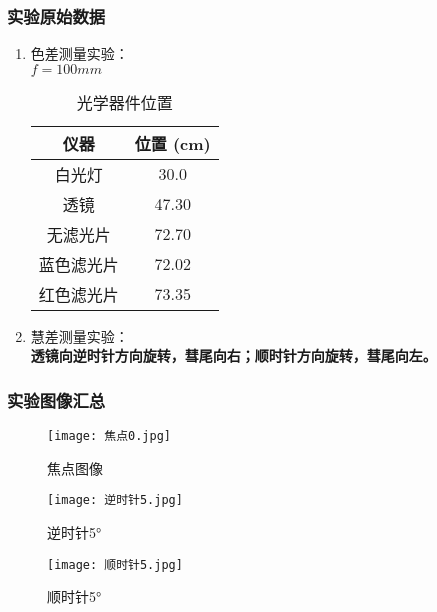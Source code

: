 \documentclass[dvipsnames, svgnames,a4paper,11pt]{article}
\begin{document}
\subsubsection{实验原始数据}
\begin{enumerate}
	\item 色差测量实验：\\$f=100mm$\\
	\begin{table}[htbp]
		\centering
		\begin{tabular}{|c|c|}
			\hline
			仪器& 位置 (cm) \\
			\hline
			白光灯 & 30.0 \\
			透镜 & 47.30 \\
			无滤光片 & 72.70 \\
			蓝色滤光片 & 72.02 \\
			红色滤光片 & 73.35 \\
			\hline
		\end{tabular}
		\caption{光学器件位置}
		\label{tab:positions}
	\end{table}
	      
	\item 慧差测量实验：\\\textbf{透镜向逆时针方向旋转，彗尾向右；顺时针方向旋转，彗尾向左。}

	
	    
	      
\end{enumerate}

\subsubsection{实验图像汇总}
\begin{figure}[H]
	\begin{minipage}[b]{0.3\linewidth}
	  \centering
	  \texttt{[image: 焦点0.jpg]}
	  \caption{焦点图像}
	  \label{fig:sub1}
	\end{minipage}
	\hfill
	\begin{minipage}[b]{0.3\linewidth}
	  \centering
	  \texttt{[image: 逆时针5.jpg]}
	  \caption{逆时针5°}
	  \label{fig:sub2}
	\end{minipage}
	\hfill
	\begin{minipage}[b]{0.3\linewidth}
	  \centering
	  \texttt{[image: 顺时针5.jpg]}
	  \caption{顺时针5°}
	  \label{fig:sub3}
	\end{minipage}
  \end{figure}
  
\end{document}
